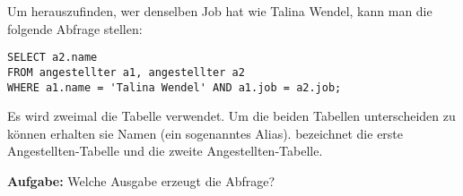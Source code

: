 Um herauszufinden, wer denselben Job hat wie Talina Wendel, kann man die folgende Abfrage stellen:

\begin{lstlisting}
SELECT a2.name
FROM angestellter a1, angestellter a2
WHERE a1.name = 'Talina Wendel' AND a1.job = a2.job;
\end{lstlisting}

Es wird zweimal die Tabelle  verwendet. Um die beiden
Tabellen unterscheiden zu können erhalten sie Namen (ein sogenanntes Alias).
 bezeichnet die erste Angestellten-Tabelle und 
die zweite Angestellten-Tabelle.

\textbf{Aufgabe:} Welche Ausgabe erzeugt die Abfrage?